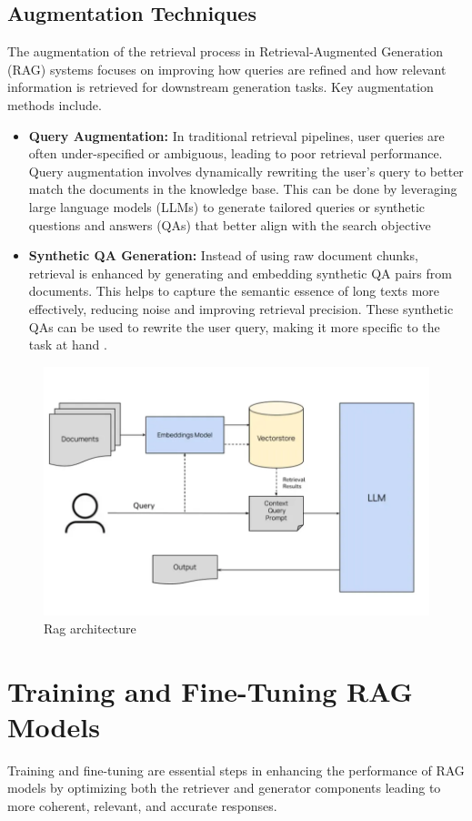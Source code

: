 \subsection{ Augmentation Techniques}
The augmentation of the retrieval process in Retrieval-Augmented Generation (RAG) systems focuses on improving how queries are refined and how relevant information is retrieved for downstream generation tasks. Key augmentation methods include.
\begin{itemize}
	\item \textbf{Query Augmentation:} In traditional retrieval pipelines, user queries are often under-specified or ambiguous, leading to poor retrieval performance. Query augmentation involves dynamically rewriting the user's query to better match the documents in the knowledge base. This can be done by leveraging large language models (LLMs) to generate tailored queries or synthetic questions and answers (QAs) that better align with the search objective​
	\item \textbf{Synthetic QA Generation:} Instead of using raw document chunks, retrieval is enhanced by generating and embedding synthetic QA pairs from documents. This helps to capture the semantic essence of long texts more effectively, reducing noise and improving retrieval precision. These synthetic QAs can be used to rewrite the user query, making it more specific to the task at hand \cite{mombaerts2024meta}.
\end{itemize}
\begin{figure}
	\centering
	\includegraphics[width=0.9\linewidth]{Figures/rag_architectur.png}
	\caption{Rag architecture}
	\label{rag_architectur.png}
\end{figure}
\section{Training and Fine-Tuning RAG Models}
Training and fine-tuning are essential steps in enhancing the performance of RAG models by optimizing both the retriever and generator components leading to more coherent, relevant, and accurate responses.
